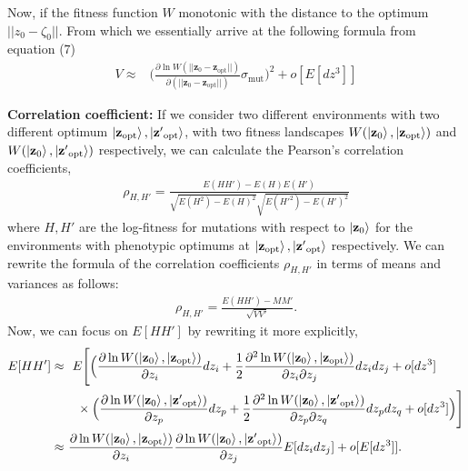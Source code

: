 \documentclass[11pt]{article}
\begin{document}
    Now, if the fitness function \( W\) monotonic with the distance to the optimum \(||{z_0}-{\zeta_0}||\). From which we essentially arrive at the following formula from equation (7)
    \begin{align*}
        V \approx& \Bigg(\frac{\partial \ln W(||\mathbf{z}_0 - \mathbf{z}_{\mathrm{opt}} ||)}{\partial(||\mathbf{z}_0 - \mathbf{z}_{\mathrm{opt}} ||)} \sigma_{\mathrm{mut}} \Bigg)^2 + o[E[dz^3]] \tag{8}
    \end{align*}
    
\textbf{Correlation coefficient:} If we consider two different environments with two different optimum $\ket{\mathbf{z}_{\mathrm{opt}}}, \ket{\mathbf{z'}_{\mathrm{opt}}}$, with two fitness landscapes $W(\ket{\mathbf{z}_0}, \ket{\mathbf{z}_{\mathrm{opt}}})$ and $W(\ket{\mathbf{z}_0}, \ket{\mathbf{z'}_{\mathrm{opt}}})$ respectively, we can calculate the Pearson's correlation coefficients,
    \begin{align*}
        \rho_{H,H'} = \frac{E(HH')-E(H)E(H')}{\sqrt{E(H^2)-E(H)^2}\sqrt{E(H'^2)-E(H')^2}} 
    \end{align*}
    where $H, H'$ are the log-fitness for mutations with respect to $\ket{\mathbf{z}_0}$ for the environments with phenotypic optimums at $\ket{\mathbf{z}_{\mathrm{opt}}}, \ket{\mathbf{z'}_{\mathrm{opt}}}$ respectively. We can rewrite the formula of the correlation coefficients $\rho_{H,H'}$ in terms of means and variances as follows:
    \begin{align*}
        \rho_{H,H'} = \frac{E(HH')-MM'}{\sqrt{V V'}}.
    \end{align*}
    Now, we can focus on $E[HH']$ by rewriting it more explicitly,
    \begin{align*}
        E[HH'] \approx& \ \ E\Bigg[\Big( \frac{\partial \ln W(\ket{\mathbf{z}_0}, \ket{\mathbf{z}_{\mathrm{opt}}})}{\partial z_i} dz_i  + \frac{1}{2}  \frac{\partial^2 \ln W(\ket{\mathbf{z}_0}, \ket{\mathbf{z}_{\mathrm{opt}}})}{\partial z_i \partial z_j} dz_i dz_j + o[dz^3] \\
        & \quad \times\Big( \frac{\partial \ln W(\ket{\mathbf{z}_0},\ket{\mathbf{z'}_{\mathrm{opt}}})}{\partial z_p} dz_p  + \frac{1}{2} \frac{\partial^2 \ln W(\ket{\mathbf{z}_0}, \ket{\mathbf{z'}_{\mathrm{opt}}})}{\partial z_p \partial z_q} dz_p dz_q + o[dz^3]\Big)\Bigg] \\
        \approx& \ \frac{\partial \ln W(\ket{\mathbf{z}_0}, \ket{\mathbf{z}_{\mathrm{opt}}})}{\partial z_i} \frac{\partial \ln W(\ket{\mathbf{z}_0},\ket{\mathbf{z'}_{\mathrm{opt}}})}{\partial z_j}  E[dz_i dz_j] + o[E[dz^3]].
    \end{align*}
\end{document}
